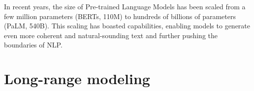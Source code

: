 In recent years, the size of Pre-trained Language Models has been scaled from a few million parameters (\acp{BERT}, 110M) to hundreds of billions of parameters (PaLM, 540B). This scaling has boasted capabilities, enabling models to generate even more coherent and natural-sounding text and further pushing the boundaries of \ac{NLP}. 





\section{Long-range modeling}
\label{sec:chapter2-long-range}

